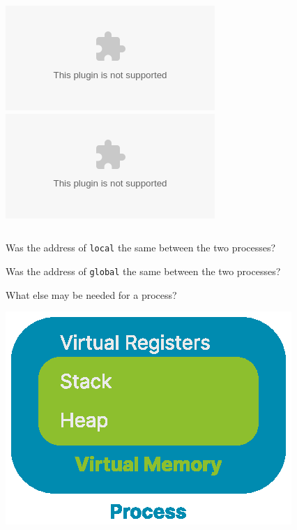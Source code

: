 \begin{slide}
  

  \centering

  \includegraphics<1>{memory-layout-first.eps}%
  \includegraphics<2>{memory-layout-second.eps}
\end{slide}

\begin{slide}
  

  \inputminted{c}{count.c}

\end{slide}

\begin{slide}
  

  Was the address of \texttt{local} the same between the two processes?
  \medskip

  Was the address of \texttt{global} the same between the two processes?
  \medskip

  What else may be needed for a process?
\end{slide}

\begin{slide}
  

  \centering

  \includegraphics{process-virtual-memory.eps}

\end{slide}


